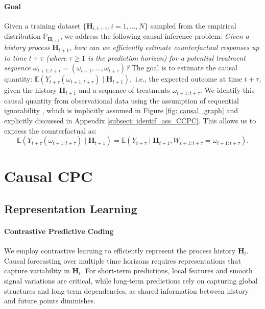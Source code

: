 \documentclass{article}
\theoremstyle{plain}
\theoremstyle{definition}
\theoremstyle{remark}
\begin{document}
\paragraph{Goal} Given a training dataset $\{\mathbf{H}_{i, t+1}, i=1,\dots, N \}$ sampled from the empirical distribution $\mathbb{P}_{\mathbf{H}_{t+1}}$, we address the following causal inference problem: \emph{Given a history process $\mathbf{H}_{t+1}$, how can we efficiently estimate counterfactual responses up to time $t + \tau$ (where $\tau \geq 1$ is the prediction horizon) for a potential treatment sequence $\omega_{t+1:t+\tau} = (\omega_{t + 1}, \dots, \omega_{t + \tau})$?} The goal is to estimate the causal quantity: \(\mathbb{E}(Y_{t+\tau}(\omega_{t+1:t+\tau})\mid \mathbf{H}_{t+1}),\) i.e., the expected outcome at time $t + \tau$, given the history $\mathbf{H}_{t+1}$ and a sequence of treatments $\omega_{t+1:t+\tau}$. We identify this causal quantity from observational data using the assumption of sequential ignorability \citep{robins-time-varying-exposures, lim2018forecasting, Li2021GNetAR, Melnychuk2022CausalTF}, which is implicitly assumed in Figure \ref{fig: causal_graph} and explicitly discussed in Appendix \ref{subsect: identif_ass_CCPC}. This allows us to express the counterfactual as:
\[
\mathbb{E}(Y_{t+\tau}(\omega_{t+1:t+\tau})\mid \mathbf{H}_{t+1}) = \mathbb{E}\left(Y_{t+\tau}\mid \mathbf{H}_{t+1}, W_{t+1:t+\tau} = \omega_{t+1:t+\tau}\right).
\]
\section{Causal CPC}
\label{sect: causal_cpc_def}
\subsection{Representation Learning}
\paragraph{Contrastive Predictive Coding} We employ contrastive learning to efficiently represent the process history $\mathbf{H}_t$. Causal forecasting over multiple time horizons requires representations that capture variability in $\mathbf{H}_t$. For short-term predictions, local features and smooth signal variations are critical, while long-term predictions rely on capturing global structures and long-term dependencies, as shared information between history and future points diminishes.
\end{document}
